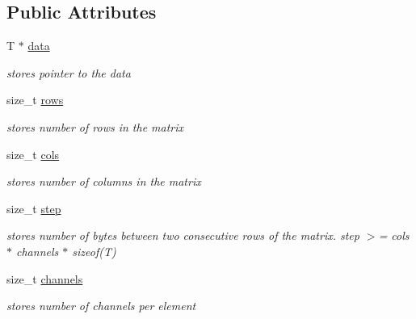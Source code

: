\subsection*{Public Attributes}
\begin{DoxyCompactItemize}
\item 
\hypertarget{class_my_mat_a29154d1b11ce91aaaa52eb83a35f50c0}{}T $\ast$ \hyperlink{class_my_mat_a29154d1b11ce91aaaa52eb83a35f50c0}{data}\label{class_my_mat_a29154d1b11ce91aaaa52eb83a35f50c0}

\begin{DoxyCompactList}\small\item\em stores pointer to the data \end{DoxyCompactList}\item 
\hypertarget{class_my_mat_a56110a94bf33f0af3c52ef5b8cf739d7}{}size\+\_\+t \hyperlink{class_my_mat_a56110a94bf33f0af3c52ef5b8cf739d7}{rows}\label{class_my_mat_a56110a94bf33f0af3c52ef5b8cf739d7}

\begin{DoxyCompactList}\small\item\em stores number of rows in the matrix \end{DoxyCompactList}\item 
\hypertarget{class_my_mat_a93f65293f20bf1bff456f4aabf5c313f}{}size\+\_\+t \hyperlink{class_my_mat_a93f65293f20bf1bff456f4aabf5c313f}{cols}\label{class_my_mat_a93f65293f20bf1bff456f4aabf5c313f}

\begin{DoxyCompactList}\small\item\em stores number of columns in the matrix \end{DoxyCompactList}\item 
\hypertarget{class_my_mat_a0bc5135809fda64e6cd0515e4930237b}{}size\+\_\+t \hyperlink{class_my_mat_a0bc5135809fda64e6cd0515e4930237b}{step}\label{class_my_mat_a0bc5135809fda64e6cd0515e4930237b}

\begin{DoxyCompactList}\small\item\em stores number of bytes between two consecutive rows of the matrix. step $>$= cols $\ast$ channels $\ast$ sizeof(\+T) \end{DoxyCompactList}\item 
\hypertarget{class_my_mat_a25287cc2362682c8357dde5d4da24a2c}{}size\+\_\+t \hyperlink{class_my_mat_a25287cc2362682c8357dde5d4da24a2c}{channels}\label{class_my_mat_a25287cc2362682c8357dde5d4da24a2c}

\begin{DoxyCompactList}\small\item\em stores number of channels per element \end{DoxyCompactList}\end{DoxyCompactItemize}


